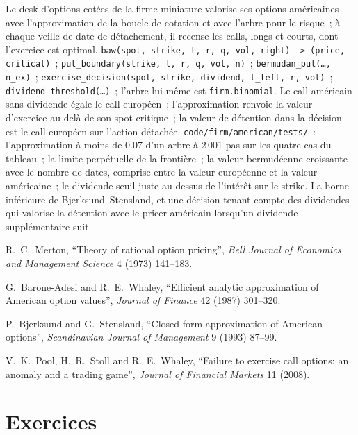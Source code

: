 \begin{build}
 Le desk d'options cotées de la firme miniature valorise ses options américaines
avec l'approximation de la boucle de cotation et avec l'arbre pour le risque~; à chaque veille de
date de détachement, il recense les calls, longs et courts, dont l'exercice est optimal.
 \texttt{baw(spot, strike, t, r, q, vol, right) -> (price, critical)}~;
\texttt{put\_boundary(strike, t, r, q, vol, n)}~; \texttt{bermudan\_put(\ldots, n\_ex)}~;
\texttt{exercise\_decision(spot, strike, dividend, t\_left, r, vol)}~;
\texttt{dividend\_threshold(\ldots)}~; l'arbre lui-même est \texttt{firm.binomial}.
 Le call américain sans dividende égale le call européen~; l'approximation
renvoie la valeur d'exercice au-delà de son spot critique~; la valeur de détention dans la décision est
le call européen sur l'action détachée.
 \texttt{code/firm/american/tests/}~: l'approximation à moins
de 0.07 d'un arbre à 2\,001 pas sur les quatre cas du tableau~; la limite perpétuelle de la
frontière~; la valeur bermudéenne croissante avec le nombre de dates, comprise entre la valeur européenne et
la valeur américaine~; le dividende seuil juste au-dessus de l'intérêt sur le strike.
 La borne inférieure de Bjerksund--Stensland, et une décision tenant compte des dividendes qui
valorise la détention avec le pricer américain lorsqu'un dividende supplémentaire suit.
\end{build}

\begin{omsources}
\item R.~C.~Merton, ``Theory of rational option pricing'', \emph{Bell Journal of Economics
and Management Science} 4 (1973) 141--183.
\item G.~Barone-Adesi and R.~E.~Whaley, ``Efficient analytic approximation of American
option values'', \emph{Journal of Finance} 42 (1987) 301--320.
\item P.~Bjerksund and G.~Stensland, ``Closed-form approximation of American options'',
\emph{Scandinavian Journal of Management} 9 (1993) 87--99.
\item V.~K.~Pool, H.~R.~Stoll and R.~E.~Whaley, ``Failure to exercise call options: an
anomaly and a trading game'', \emph{Journal of Financial Markets} 11 (2008).
\end{omsources}

\section{Exercices}


